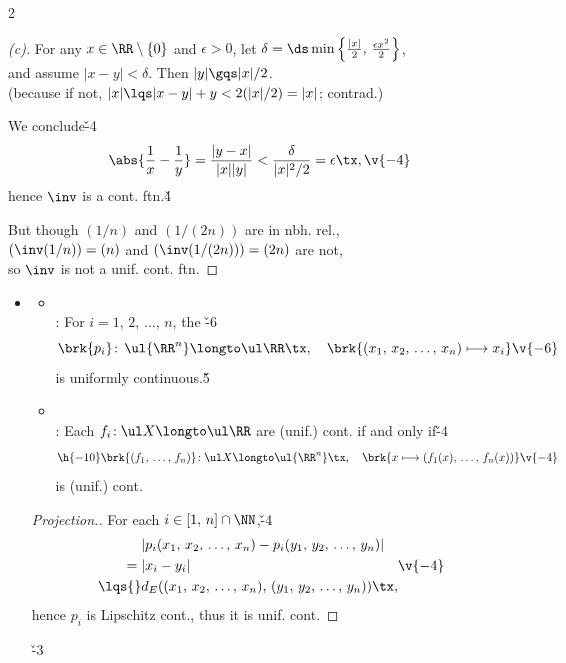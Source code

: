 \documentclass[dvipdfmx,a4paper,titlepage,9pt]{jsarticle}
\begin{document}
\begin{multicols*}{2}
\begin{pfbox}
\dotfill

\begin{proof}[(c)]
For any $x\in\RR\setminus\{0\}$ and $\epsilon>0$, let $\delta=\ds\min\left\{\frac{|x|}2,\,\frac{\epsilon x^2}2\right\}$,\\
and assume $|x-y|<\delta$. Then $|y|\gqs|x|/2$.\\
(because if not, $|x|\lqs|x-y|+y<2(|x|/2)=|x|$; contrad.)

We conclude\v{-4}
$$\abs{\frac1x-\frac1y}=\frac{|y-x|}{|x||y|}<\frac\delta{|x|^2/2}=\epsilon\tx,\v{-4}$$
hence $\inv$ is a cont. ftn.\v4

But though $(1/n)$ and $(1/(2n))$ are in nbh. rel.,\\
$(\inv(1/n))=(n)$ and $(\inv(1/(2n)))=(2n)$ are not,\\
so $\inv$ is not a unif. cont. ftn.
\end{proof}
\end{pfbox}

\vfill\null\columnbreak

\begin{itemize}[label=-]
\item{}
\begin{itemize}[label=\Cdot]
\setlength{\leftskip}{-10pt}
\item {}\\
: For $i=1$, $2$, $\ldots$, $n$, the \v{-6}
$$\brk{p_i}\!:\,\ul{\RR^n}\longto\ul\RR\tx,\quad \brk{(x_1,\,x_2,\,\ldots,\,x_n)\longmapsto x_i}\v{-6}$$
is uniformly continuous.\v5

\item{}\\
: Each $f_i\!:\ul X\longto\ul\RR$ are (unif.) cont. if and only if\v{-4}
$$\h{-10}\brk{(f_1,\,\ldots,\,f_n)}\!:\ul X\longto\ul{\RR^n}\tx,\quad \brk{x\longmapsto(f_1(x),\,\ldots,\,f_n(x))}\v{-4}$$
is (unif.) cont.
\end{itemize}

\begin{pfbox}
\begin{proof}[{\color{TGreen}Projection.}]
For each $i\in[1,\,n]\cap\NN$,\v{-4}
$$\begin{aligned}
&|p_i(x_1,\,x_2,\,\ldots,\,x_n)-p_i(y_1,\,y_2,\,\ldots,\,y_n)|\\
={}&|x_i-y_i|\\
\lqs{}&d_E((x_1,\,x_2,\,\ldots,\,x_n),\,(y_1,\,y_2,\,\ldots,\,y_n))\tx,
\end{aligned}\v{-4}$$
hence $p_i$ is Lipschitz cont., thus it is unif. cont.
\end{proof}\v{-3}


\end{pfbox}
\end{itemize}
\end{multicols*}
\end{document}
